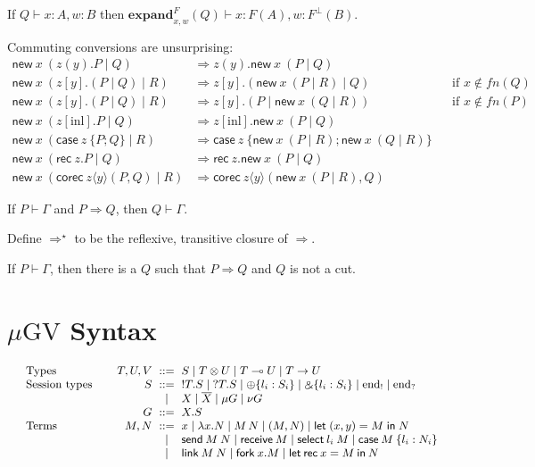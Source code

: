 \documentclass[orivec,envcountsame]{llncs}
\newcommand{\with}{\mathbin\binampersand}
\newcommand{\cpdual}[1]{#1^\perp}
\newcommand{\gvdual}[1]{\overline{#1}}
\newcommand{\gvout}[2]{{!#1.#2}}
\newcommand{\gvin}[2]{{?#1.#2}}
\newcommand{\lto}{\ensuremath{\multimap}}
\newcommand{\uto}{\ensuremath{\rightarrow}}
\newcommand{\outterm}{\mathrm{end}_!}
\newcommand{\interm}{\mathrm{end}_?}
\newcommand{\cptyp}[2]{#1 \vdash #2}
\newcommand{\expand}[3]{\mathbf{expand}^{#1}_{#2}(#3)}
\newcommand{\mkwd}[1]{\mathsf{#1}}
\newcommand{\cut}[4]{\mkwd{new}\:#1 \: (#3 \mid #4)}
\newcommand{\rec}[1]{\mkwd{rec}\:#1}
\newcommand{\corec}[5]{\mkwd{corec}\:#1 \langle #2 \rangle (#4,#5)}
\newcommand{\clabel}[1]{\mathrm{#1}}
\renewcommand{\case}[2]{\mkwd{case}\:#1\:\{#2\}}
\newcommand{\sel}[2]{#1[\clabel{#2}]}
\newcommand{\gvsend}[2]{\mkwd{send}\:#1\:#2}
\newcommand{\gvreceive}[1]{\mkwd{receive}\:#1}
\newcommand{\gvlet}[3]{\mkwd{let}\;#1 = #2\;\mkwd{in}\;#3}
\newcommand{\gvselect}[2]{\mkwd{select}\:#1\:#2}
\newcommand{\gvcase}[2]{\mkwd{case}\:#1\:\{#2\}}
\newcommand{\gvlink}[2]{\mkwd{link}\:#1\:#2}
\newcommand{\gvfork}[2]{\mkwd{fork}\:#1.#2}
\newcommand{\gvletrec}[3]{\mkwd{let}\:\mkwd{rec}\:#1 = #2\:\mkwd{in}\:#3}
\newcommand{\mugv}{$\mu\mathrm{GV}$}
\begin{document}
\begin{lemma}
  If $\cptyp{Q}{x:A,w:B}$ then \(\cptyp{\expand{F}{x,w}{Q}}{x:F(A), w:\cpdual{F}(B)}.\)
\end{lemma}

Commuting conversions are unsurprising:
{\small\begin{align*}
  \cut{x}{A}{z(y).P}{Q} &\Longrightarrow z(y).\cut{x}{A}{P}{Q} \\
  \cut{x}{A}{z[y].(P \mid Q)}{R} &\Longrightarrow z[y].(\cut{x}{A}{P}{R} \mid Q) &&\text{if $x \not\in fn(Q)$} \\
  \cut{x}{A}{z[y].(P \mid Q)}{R} &\Longrightarrow z[y].(P \mid \cut{x}{A}{Q}{R}) &&\text{if $x \not\in fn(P)$} \\
  \cut{x}{A}{\sel{z}{inl}.P}{Q} &\Longrightarrow \sel{z}{inl}.\cut{x}{A}{P}{Q} \\
  \cut{x}{A}{\case{z}{P;Q}}{R} &\Longrightarrow \case{z}{\cut{x}{A}{P}{R}; \cut{x}{A}{Q}{R}} \\
  \cut{x}{A}{\rec{z}.P}{Q} &\Longrightarrow \rec{z}.\cut{x}{A}{P}{Q} \\
  \cut{x}{A}{\corec{z}{y}{B}{P}{Q}}{R} &\Longrightarrow \corec{z}{y}{B}{\cut{x}{A}{P}{R}}{Q}
\end{align*}}

\begin{theorem}
  If $\cptyp{P}{\Gamma}$ and $P \Longrightarrow Q$, then $\cptyp{Q}{\Gamma}.$
\end{theorem}

Define $\Longrightarrow^\star$ to be the reflexive, transitive closure of $\Longrightarrow$.

\begin{theorem}
  If $\cptyp{P}{\Gamma}$, then there is a $Q$ such that $P \Longrightarrow Q$ and $Q$ is not a cut.
\end{theorem}


\section{\mugv{} Syntax}

\[\small\begin{array}{l@{\hspace{7mm}}r@{\hspace{2mm}}c@{\hspace{2mm}}l}
  \text{Types} & T,U,V & ::= & S \mid T \otimes U \mid T \lto U \mid T \uto U \\
  \text{Session types} & S & ::= & \gvout{T}{S} \mid \gvin{T}{S} \mid \oplus \{ l_i : S_i \} \mid \with \{ l_i : S_i \} \mid \outterm \mid \interm \\
   & & \mid & X \mid \gvdual{X} \mid \mu G \mid \nu G \\
   & G & ::= & X.S \\
  \text{Terms} & M,N & ::= & x \mid \lambda x.N \mid M\,N \mid (M,N) \mid \gvlet{(x,y)}{M}{N} \\
   & & \mid & \gvsend{M}{N} \mid \gvreceive{M} \mid \gvselect{l_i}{M} \mid \gvcase{M}{l_i : N_i} \\
   & & \mid & \gvlink{M}{N} \mid \gvfork{x}{M} \mid \gvletrec{x}{M}{N}
\end{array}\]
\end{document}
